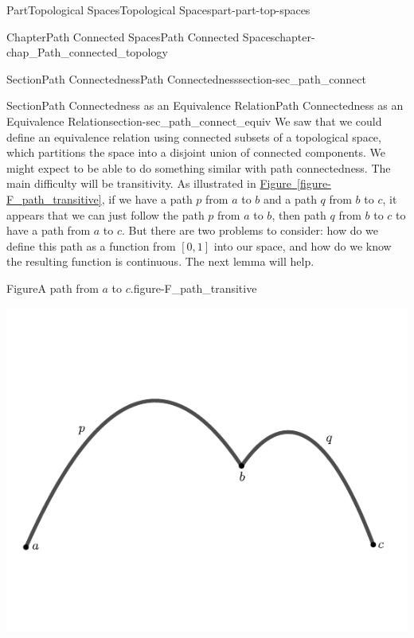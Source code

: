 \documentclass[oneside,10pt,]{book}
\newcommand{\xreffont}{\relax}
\numberwithin{equation}{chapter}
\begin{document}
\begin{partptx}{Part}{Topological Spaces}{}{Topological Spaces}{}{}{part-part-top-spaces}
\begin{chapterptx}{Chapter}{Path Connected Spaces}{}{Path Connected Spaces}{}{}{chapter-chap_Path_connected_topology}
\begin{sectionptx}{Section}{Path Connectedness}{}{Path Connectedness}{}{}{section-sec_path_connect}
\end{sectionptx}
%
%
\typeout{************************************************}
\typeout{************************************************}
%
\begin{sectionptx}{Section}{Path Connectedness as an Equivalence Relation}{}{Path Connectedness as an Equivalence Relation}{}{}{section-sec_path_connect_equiv}
We saw that we could define an equivalence relation using connected subsets of a topological space, which partitions the space into a disjoint union of connected components. We might expect to be able to do something similar with path connectedness. The main difficulty will be transitivity. As illustrated in \hyperref[figure-F_path_transitive]{Figure~{\xreffont\ref{figure-F_path_transitive}}}, if we have a path \(p\) from \(a\) to \(b\) and a path \(q\) from \(b\) to \(c\), it appears that we can just follow the path \(p\) from \(a\) to \(b\), then path \(q\) from \(b\) to \(c\) to have a path from \(a\) to \(c\). But there are two problems to consider: how do we define this path as a function from \([0,1]\) into our space, and how do we know the resulting function is continuous. The next lemma will help.%
\begin{figureptx}{Figure}{A path from \(a\) to \(c\).}{figure-F_path_transitive}{}%
\begin{image}{0.25}{0.5}{0.25}{}%
\includegraphics[width=\linewidth]{external/path_transitive.pdf}
\end{image}%
\tcblower
\end{figureptx}%

\end{sectionptx}
\end{chapterptx}
\end{partptx}
\end{document}
